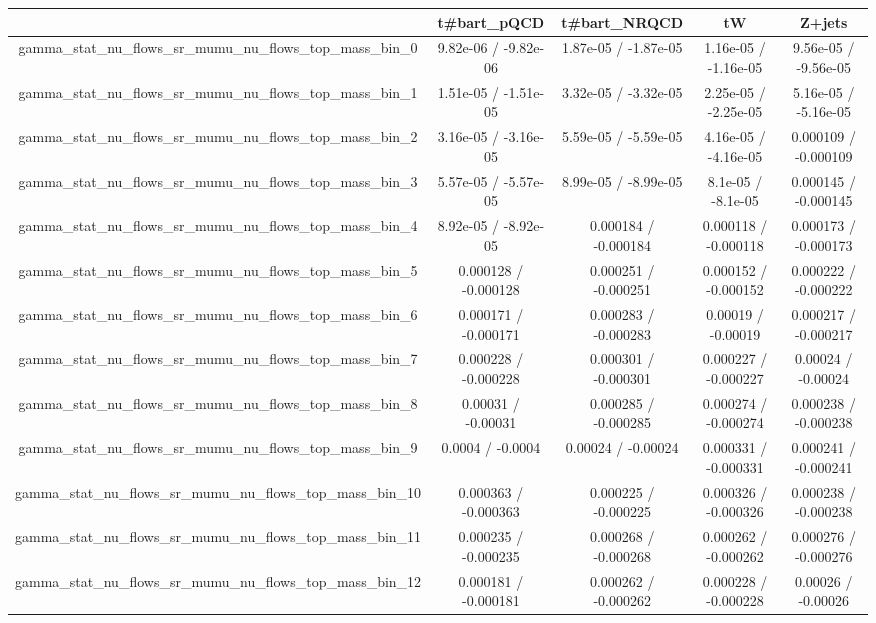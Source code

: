\documentclass[10pt]{article}
\begin{document}
\begin{table}[htbp]
\begin{center}
\begin{tabular}{|c|c|c|c|c|}
\hline 
      & t#bar{t}_{pQCD}      & t#bar{t}_{NRQCD}      & tW      & Z+jets \\ 
\hline 
  gamma_stat_nu_flows_sr_mumu_nu_flows_top_mass_bin_0 & 9.82e-06 / -9.82e-06 & 1.87e-05 / -1.87e-05 & 1.16e-05 / -1.16e-05 & 9.56e-05 / -9.56e-05 \\ 
  gamma_stat_nu_flows_sr_mumu_nu_flows_top_mass_bin_1 & 1.51e-05 / -1.51e-05 & 3.32e-05 / -3.32e-05 & 2.25e-05 / -2.25e-05 & 5.16e-05 / -5.16e-05 \\ 
  gamma_stat_nu_flows_sr_mumu_nu_flows_top_mass_bin_2 & 3.16e-05 / -3.16e-05 & 5.59e-05 / -5.59e-05 & 4.16e-05 / -4.16e-05 & 0.000109 / -0.000109 \\ 
  gamma_stat_nu_flows_sr_mumu_nu_flows_top_mass_bin_3 & 5.57e-05 / -5.57e-05 & 8.99e-05 / -8.99e-05 & 8.1e-05 / -8.1e-05 & 0.000145 / -0.000145 \\ 
  gamma_stat_nu_flows_sr_mumu_nu_flows_top_mass_bin_4 & 8.92e-05 / -8.92e-05 & 0.000184 / -0.000184 & 0.000118 / -0.000118 & 0.000173 / -0.000173 \\ 
  gamma_stat_nu_flows_sr_mumu_nu_flows_top_mass_bin_5 & 0.000128 / -0.000128 & 0.000251 / -0.000251 & 0.000152 / -0.000152 & 0.000222 / -0.000222 \\ 
  gamma_stat_nu_flows_sr_mumu_nu_flows_top_mass_bin_6 & 0.000171 / -0.000171 & 0.000283 / -0.000283 & 0.00019 / -0.00019 & 0.000217 / -0.000217 \\ 
  gamma_stat_nu_flows_sr_mumu_nu_flows_top_mass_bin_7 & 0.000228 / -0.000228 & 0.000301 / -0.000301 & 0.000227 / -0.000227 & 0.00024 / -0.00024 \\ 
  gamma_stat_nu_flows_sr_mumu_nu_flows_top_mass_bin_8 & 0.00031 / -0.00031 & 0.000285 / -0.000285 & 0.000274 / -0.000274 & 0.000238 / -0.000238 \\ 
  gamma_stat_nu_flows_sr_mumu_nu_flows_top_mass_bin_9 & 0.0004 / -0.0004 & 0.00024 / -0.00024 & 0.000331 / -0.000331 & 0.000241 / -0.000241 \\ 
  gamma_stat_nu_flows_sr_mumu_nu_flows_top_mass_bin_10 & 0.000363 / -0.000363 & 0.000225 / -0.000225 & 0.000326 / -0.000326 & 0.000238 / -0.000238 \\ 
  gamma_stat_nu_flows_sr_mumu_nu_flows_top_mass_bin_11 & 0.000235 / -0.000235 & 0.000268 / -0.000268 & 0.000262 / -0.000262 & 0.000276 / -0.000276 \\ 
  gamma_stat_nu_flows_sr_mumu_nu_flows_top_mass_bin_12 & 0.000181 / -0.000181 & 0.000262 / -0.000262 & 0.000228 / -0.000228 & 0.00026 / -0.00026 \\ 

\end{tabular}
\end{center}
\end{table}
\end{document}
